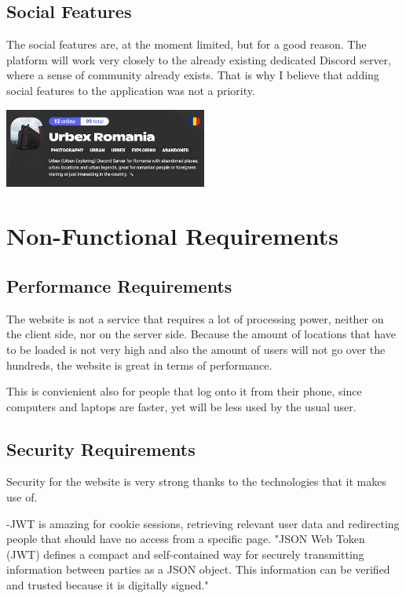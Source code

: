 \documentclass[12pt,a4paper]{report}
\begin{document}
\subsection{Social Features}
The social features are, at the moment limited, but for a good reason. The platform will work very closely to the already existing dedicated Discord server, where a sense of community already exists. That is why I believe that adding social features to the application was not a priority.

\begin{center}
\includegraphics[width=0.5\textwidth]{images/discord.png}
\end{center}

\section{Non-Functional Requirements}
\subsection{Performance Requirements}
The website is not a service that requires a lot of processing power, neither on the client side, nor on the server side. Because the amount of locations that have to be loaded is not very high and also the amount of users will not go over the hundreds, the website is great in terms of performance.

This is convienient also for people that log onto it from their phone, since computers and laptops are faster, yet will be less used by the usual user.

\subsection{Security Requirements}
Security for the website is very strong thanks to the technologies that it makes use of.

-JWT is amazing for cookie sessions, retrieving relevant user data and redirecting people that should have no access from a specific page.
"JSON Web Token (JWT) defines a compact and self-contained way for securely transmitting information between parties as a JSON object. This information can be verified and trusted because it is digitally signed."~\cite{JWT}
\end{document}
